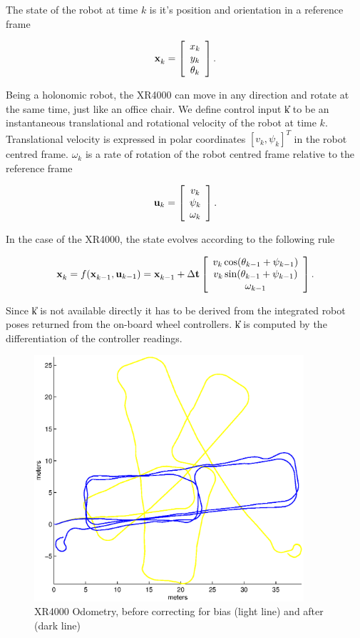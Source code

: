 The state of the robot at time $k$ is it's position and orientation in a
reference frame

$$
\x{k}{}{} = \left[\begin{array}{c} 
    x_k \\ 
    y_k \\ 
    \theta_k
  \end{array}\right].
$$

Being a holonomic robot, the XR4000 can move in any direction and rotate
at the same time, just like an office chair. We define control input
\U{k} to be an instantaneous translational and rotational velocity of
the robot at time $k$. Translational velocity is expressed in polar
coordinates $[v_k,\psi_k]^T$ in the robot centred frame. $\omega_k$ is
a rate of rotation of the robot centred frame relative to the
reference frame

$$
{\bf u}_{k} = \left[\begin{array}{c} v_k\\ \psi_k \\ \omega_k \end{array} \right].
$$

In the case of the XR4000, the state evolves according to the following
rule

$$
\x{k}{}{} = f(\x{k-1}{}{} ,\U{k-1}) = \x{k-1}{}{} + \Delta {\bf t}
\Vector{v_k\cos(\theta_{k-1} + \psi_{k-1})\\
v_k\sin(\theta_{k-1} + \psi_{k-1})\\
\omega_{k-1}}.
$$

Since \U{k} is not available directly it has to be derived from the
integrated robot poses returned from the on-board wheel controllers.
\U{k} is computed by the differentiation of the controller readings.

\begin{figure}[htbp]
  \centering

  \includegraphics[width=10cm]{Pics/xr4000_raw_odo}
  
  \caption{XR4000 Odometry, before correcting for bias (light line)
    and after (dark line)}
  \label{fig:xr4000_raw_odo}
\end{figure}

